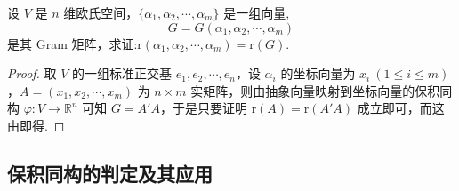 \documentclass[../../main.tex]{subfiles}
\begin{document}
\begin{proposition}\label{proposition:Gram阵的秩与其生成向量的秩相同-例9.33}
设 \(V\) 是 \(n\) 维欧氏空间，\(\{\alpha_1,\alpha_2,\cdots,\alpha_m\}\) 是一组向量,$$G = G(\alpha_1,\alpha_2,\cdots,\alpha_m)$$ 是其 Gram 矩阵，求证:$\mathrm{r}(\alpha_1,\alpha_2,\cdots,\alpha_m)=\mathrm{r}(G).$
\end{proposition}
\begin{proof}
取 \(V\) 的一组标准正交基 \(e_1,e_2,\cdots,e_n\)，设 \(\alpha_i\) 的坐标向量为 \(x_i\ (1\leqslant  i\leqslant  m)\)，\(A=(x_1,x_2,\cdots,x_m)\) 为 \(n\times m\) 实矩阵，则由抽象向量映射到坐标向量的保积同构 \(\varphi:V\rightarrow\mathbb{R}^n\) 可知 \(G = A'A\)，于是只要证明 \(\mathrm{r}(A)=\mathrm{r}(A'A)\) 成立即可，而这由即得.

\end{proof}


\subsection{保积同构的判定及其应用}
\end{document}
